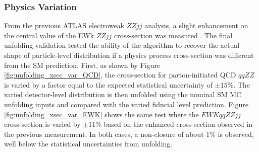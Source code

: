 \subsubsection{Physics Variation}
From the previous ATLAS electroweak $ZZjj$ analysis, a slight enhancement on the central value of the EWk $ZZjj$ cross-section was measured \cite{ATLASZZjj}. The final unfolding validation tested the ability of the algorithm to recover the actual shape of particle-level distribution if a physics process cross-section was different from the SM prediction. First, as shown by Figure \ref{fig:unfolding_xsec_var_QCD}, the cross-section for parton-initiated QCD $qqZZ$ is varied by a factor equal to the expected statistical uncertainty of $\pm  15\%$. The varied detector-level distribution is then unfolded using the nominal SM MC unfolding inputs and compared with the varied fiducial level prediction. Figure \ref{fig:unfolding_xsec_var_EWK} shows the same test where the $EWK qqZZjj$ cross-section is varied by $\pm 11\%$ based on the enhanced cross-section observed in the previous measurement. In both cases, a non-closure of about $1\%$ is observed, well below the statistical uncertainties from unfolding.

